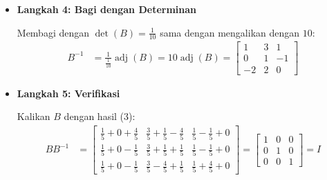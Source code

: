 \documentclass[10pt,a4paper]{article}
\begin{document}
\begin{enumerate}
\begin{enumerate}
\begin{itemize}
\item \textbf{Langkah 4: Bagi dengan Determinan}

Membagi dengan $\det(B) = \frac{1}{10}$ sama dengan mengalikan dengan $10$:
\begin{align}
B^{-1} &= \frac{1}{\frac{1}{10}}\operatorname{adj}(B) = 10\operatorname{adj}(B) = \begin{bmatrix} 1 & 3 & 1 \\ 0 & 1 & -1 \\ -2 & 2 & 0 \end{bmatrix}
\end{align}

\item \textbf{Langkah 5: Verifikasi}

Kalikan $B$ dengan hasil (3):
\begin{align}
BB^{-1} &= \begin{bmatrix}
\frac{1}{5} + 0 + \frac{4}{5} & \frac{3}{5} + \frac{1}{5} - \frac{4}{5} & \frac{1}{5} - \frac{1}{5} + 0 \\
\frac{1}{5} + 0 - \frac{1}{5} & \frac{3}{5} + \frac{1}{5} + \frac{1}{5} & \frac{1}{5} - \frac{1}{5} + 0 \\
\frac{1}{5} + 0 - \frac{1}{5} & \frac{3}{5} - \frac{4}{5} + \frac{1}{5} & \frac{1}{5} + \frac{4}{5} + 0
\end{bmatrix}
= \begin{bmatrix} 1 & 0 & 0 \\ 0 & 1 & 0 \\ 0 & 0 & 1 \end{bmatrix} = I
\end{align}
\end{itemize}
\endgroup

\end{enumerate}

\end{enumerate}
\end{document}
